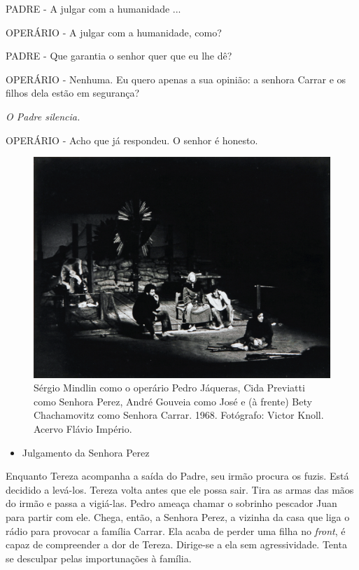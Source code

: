 PADRE - A julgar com a humanidade ...

OPERÁRIO - A julgar com a humanidade, como?

PADRE - Que garantia o senhor quer que eu lhe dê?

OPERÁRIO - Nenhuma. Eu quero apenas a sua opinião: a senhora Carrar e os
filhos dela estão em segurança?

\textit{O Padre silencia.}

OPERÁRIO - Acho que já respondeu. O senhor é honesto.

\begin{figure}
\includegraphics[width=\columnwidth]{./media/IMAGEM49.png}
\caption{Sérgio Mindlin como o operário Pedro Jáqueras, Cida Previatti como
Senhora Perez, André Gouveia como José e (à frente) Bety Chachamovitz
como Senhora Carrar. 1968. Fotógrafo: Victor Knoll. Acervo Flávio
Império.}
\end{figure}

\begin{itemize}
\item
  Julgamento da Senhora Perez
\end{itemize}

Enquanto Tereza acompanha a saída do Padre, seu irmão procura os fuzis.
Está decidido a levá-los. Tereza volta antes que ele possa sair. Tira as
armas das mãos do irmão e passa a vigiá-las. Pedro ameaça chamar o
sobrinho pescador Juan para partir com ele. Chega, então, a Senhora
Perez, a vizinha da casa que liga o rádio para provocar a família
Carrar. Ela acaba de perder uma filha no \textit{front}, é capaz de
compreender a dor de Tereza. Dirige-se a ela sem agressividade. Tenta se
desculpar pelas importunações à família.

